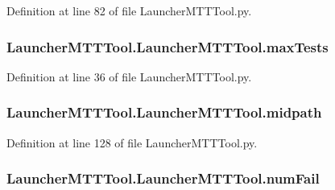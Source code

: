 Definition at line 82 of file Launcher\-M\-T\-T\-Tool.\-py.

\hypertarget{class_launcher_m_t_t_tool_1_1_launcher_m_t_t_tool_aa8e59ca462ace6b189cd849a08afa639}{
\subsubsection[{max\-Tests}]{\setlength{\rightskip}{0pt plus 5cm}Launcher\-M\-T\-T\-Tool.\-Launcher\-M\-T\-T\-Tool.\-max\-Tests}}\label{class_launcher_m_t_t_tool_1_1_launcher_m_t_t_tool_aa8e59ca462ace6b189cd849a08afa639}


Definition at line 36 of file Launcher\-M\-T\-T\-Tool.\-py.

\hypertarget{class_launcher_m_t_t_tool_1_1_launcher_m_t_t_tool_a37f255feb0dac2f1eb0e6eff2746bd7b}{
\subsubsection[{midpath}]{\setlength{\rightskip}{0pt plus 5cm}Launcher\-M\-T\-T\-Tool.\-Launcher\-M\-T\-T\-Tool.\-midpath}}\label{class_launcher_m_t_t_tool_1_1_launcher_m_t_t_tool_a37f255feb0dac2f1eb0e6eff2746bd7b}


Definition at line 128 of file Launcher\-M\-T\-T\-Tool.\-py.

\hypertarget{class_launcher_m_t_t_tool_1_1_launcher_m_t_t_tool_a17fe6e6f8981cc1f7cd1953cac37668a}{
\subsubsection[{num\-Fail}]{\setlength{\rightskip}{0pt plus 5cm}Launcher\-M\-T\-T\-Tool.\-Launcher\-M\-T\-T\-Tool.\-num\-Fail}}\label{class_launcher_m_t_t_tool_1_1_launcher_m_t_t_tool_a17fe6e6f8981cc1f7cd1953cac37668a}


